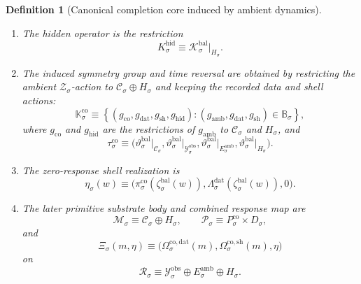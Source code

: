 \documentclass[11pt]{article}
\newcommand{\DataSpace}[1]{\mathcal Y_{#1}^{\mathrm{obs}}}
\newcommand{\AmbientTarget}[1]{E_{#1}^{\mathrm{amb}}}
\newcommand{\BalSpace}[1]{\mathcal Z_{#1}}
\newcommand{\BalBody}[1]{\mathcal B_{#1}^{\mathrm{bal}}}
\newcommand{\BalData}[1]{\Lambda_{#1}^{\mathrm{dat}}}
\newcommand{\BalShell}[1]{\Lambda_{#1}^{\mathrm{sh}}}
\newcommand{\ZeroHiddenSlice}[1]{\mathcal Z_{#1}^{0}}
\newcommand{\BalOp}[1]{\mathcal K_{#1}^{\mathrm{bal}}}
\newcommand{\BalSym}[1]{\mathbb B_{#1}}
\newcommand{\BalTime}[1]{\vartheta_{#1}^{\mathrm{bal}}}
\newcommand{\BalEmbed}[1]{\zeta_{#1}^{\mathrm{bal}}}
\newcommand{\GapSpace}[1]{H_{#1}}
\newcommand{\GapBody}[1]{D_{#1}}
\newcommand{\HiddenOperator}[1]{K_{#1}^{\mathrm{hid}}}
\newcommand{\CoreState}[1]{\mathcal C_{#1}}
\newcommand{\CoreBody}[1]{Q_{#1}^{\mathrm{co}}}
\newcommand{\CoreStateBody}[1]{P_{#1}^{\mathrm{co}}}
\newcommand{\CoreCoord}[1]{\pi_{#1}^{\mathrm{co}}}
\newcommand{\CoreDataMap}[1]{\Omega_{#1}^{\mathrm{co,dat}}}
\newcommand{\CoreShellMap}[1]{\Omega_{#1}^{\mathrm{co,sh}}}
\newcommand{\CoreSym}[1]{\mathbb K_{#1}^{\mathrm{co}}}
\newcommand{\CoreTime}[1]{\tau_{#1}^{\mathrm{co}}}
\newcommand{\CoreEmbed}[1]{\eta_{#1}}
\newcommand{\ProtoSpace}[1]{\mathcal M_{#1}}
\newcommand{\ProtoBody}[1]{\mathcal P_{#1}}
\newcommand{\ResponseSpace}[1]{\mathcal R_{#1}}
\newcommand{\ResponseMap}[1]{\Xi_{#1}}
\newtheorem{definition}{Definition}
\begin{document}
\begin{definition}[Canonical completion core induced by ambient dynamics]
\begin{enumerate}
    and the completion body is
    \begin{equation}
    \CoreBody{\sigma}
    \equiv
    \left\{
    \bigl(
    \CoreCoord{\sigma}(z),
    \BalData{\sigma}(z),
    \BalShell{\sigma}(z)
    \bigr):
    z\in\BalBody{\sigma}\cap\ZeroHiddenSlice{\sigma}
    \right\}.
    \label{eq:corebody}
    \end{equation}
    \item The hidden operator is the restriction
    \begin{equation}
    \HiddenOperator{\sigma}
    \equiv
    \BalOp{\sigma}\big|_{\GapSpace{\sigma}}.
    \label{eq:hiddenop}
    \end{equation}
    \item The induced symmetry group and time reversal are obtained by restricting the ambient \(\BalSpace{\sigma}\)-action to \(\CoreState{\sigma}\oplus\GapSpace{\sigma}\) and keeping the recorded data and shell actions:
    \[
    \CoreSym{\sigma}
    \equiv
    \left\{
    (g_{\mathrm{co}},g_{\mathrm{dat}},g_{\mathrm{sh}},g_{\mathrm{hid}}):
    (g_{\mathrm{amb}},g_{\mathrm{dat}},g_{\mathrm{sh}})
    \in\BalSym{\sigma}
    \right\},
    \]
    where \(g_{\mathrm{co}}\) and \(g_{\mathrm{hid}}\) are the restrictions of \(g_{\mathrm{amb}}\) to \(\CoreState{\sigma}\) and \(\GapSpace{\sigma}\), and
    \[
    \CoreTime{\sigma}
    \equiv
    \bigl(
    \BalTime{\sigma}\big|_{\CoreState{\sigma}},
    \BalTime{\sigma}\big|_{\DataSpace{\sigma}},
    \BalTime{\sigma}\big|_{\AmbientTarget{\sigma}},
    \BalTime{\sigma}\big|_{\GapSpace{\sigma}}
    \bigr).
    \]
    \item The zero-response shell realization is
    \begin{equation}
    \CoreEmbed{\sigma}(w)
    \equiv
    \bigl(
    \CoreCoord{\sigma}(\BalEmbed{\sigma}(w)),
    \BalData{\sigma}(\BalEmbed{\sigma}(w)),
    0
    \bigr).
    \label{eq:coreembed}
    \end{equation}
    \item The later primitive substrate body and combined response map are
    \begin{equation}
    \ProtoSpace{\sigma}
    \equiv
    \CoreState{\sigma}\oplus\GapSpace{\sigma},
    \qquad
    \ProtoBody{\sigma}
    \equiv
    \CoreStateBody{\sigma}\times\GapBody{\sigma},
    \label{eq:protobody}
    \end{equation}
    and
    \begin{equation}
    \ResponseMap{\sigma}(m,\eta)
    \equiv
    \bigl(
    \CoreDataMap{\sigma}(m),
    \CoreShellMap{\sigma}(m),
    \eta
    \bigr)
    \label{eq:responsemap}
    \end{equation}
    on
    \[
    \ResponseSpace{\sigma}
    \equiv
    \DataSpace{\sigma}\oplus\AmbientTarget{\sigma}\oplus\GapSpace{\sigma}.
    \]
\end{enumerate}
\end{definition}
\end{document}
